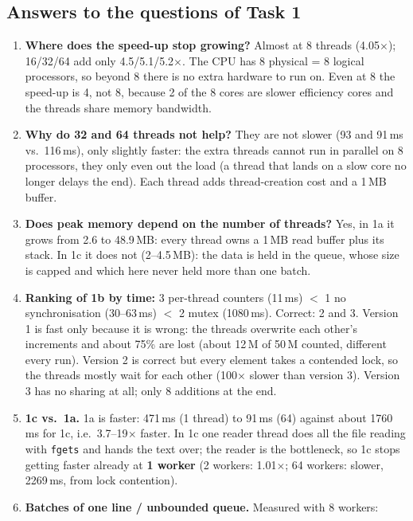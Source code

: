 \documentclass[12pt,a4paper]{article}
\newcommand{\code}[1]{\texttt{\small #1}}
\begin{document}
\subsection{Answers to the questions of Task 1}

\begin{enumerate}
  \item \textbf{Where does the speed-up stop growing?} Almost at 8 threads
        (4.05$\times$); 16/32/64 add only 4.5/5.1/5.2$\times$. The CPU has 8
        physical = 8 logical processors, so beyond 8 there is no extra
        hardware to run on. Even at 8 the speed-up is 4, not 8, because 2 of the
        8 cores are slower efficiency cores and the threads share memory bandwidth.
  \item \textbf{Why do 32 and 64 threads not help?} They are not slower
        (93 and 91\,ms vs.\ 116\,ms), only slightly faster: the extra threads
        cannot run in parallel on 8 processors, they only even out the load
        (a thread that lands on a slow core no longer delays the end). Each
        thread adds thread-creation cost and a 1\,MB buffer.
  \item \textbf{Does peak memory depend on the number of threads?} Yes, in
        1a it grows from 2.6 to 48.9\,MB: every thread owns a 1\,MB read buffer
        plus its stack. In 1c it does not (2--4.5\,MB): the data is held in the
        queue, whose size is capped and which here never held more than one batch.
  \item \textbf{Ranking of 1b by time:} 3 per-thread counters (11\,ms)
        $<$ 1 no synchronisation (30--63\,ms) $<$ 2 mutex (1080\,ms).
        Correct: 2 and 3. Version 1 is fast only because it is wrong: the
        threads overwrite each other's increments and about 75\% are lost
        (about 12\,M of 50\,M counted, different every run). Version 2 is
        correct but every element takes a contended lock, so the threads mostly
        wait for each other (100$\times$ slower than version 3). Version 3 has
        no sharing at all; only 8 additions at the end.
  \item \textbf{1c vs.\ 1a.} 1a is faster: 471\,ms (1 thread) to 91\,ms (64)
        against about 1760\,ms for 1c, i.e.\ 3.7--19$\times$ faster. In 1c
        one reader thread does all the file reading with \code{fgets} and
        hands the text over; the reader is the bottleneck, so 1c stops getting
        faster already at \textbf{1 worker} (2 workers: 1.01$\times$; 64
        workers: slower, 2269\,ms, from lock contention).
  \item \textbf{Batches of one line / unbounded queue.} Measured with 8 workers:

\end{enumerate}
\end{document}

